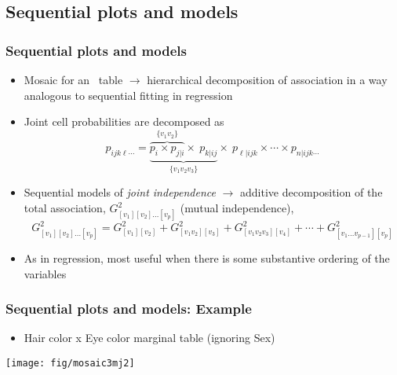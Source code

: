 \subsection{Sequential plots and models}
\begin{frame}
  \frametitle{Sequential plots and models}
  \begin{itemize}
	\item Mosaic for an \nway\ table $\rightarrow$ hierarchical decomposition of association in a way
analogous to \alert{sequential fitting} in regression
    \item Joint cell probabilities are decomposed as
\begin{equation*}
p_{ijk\ell \cdots} = \underbrace{\overbrace{p_i \times p_{j|i}}^{\{v_1 v_2\}} \times \: p_{k|ij}}_{\{v_1 v_2 v_3\}}
       \times \: p_{\ell|ijk} \times\cdots \times p_{n|ijk\cdots}
\end{equation*}
	
	\item Sequential models of \emph{joint independence} $\rightarrow$
	additive decomposition of the total association,
	$G^2_{[v_1] [v_2] \dots [v_p]}$ (mutual independence),
\begin{equation*}
G^2_{[v_1] [v_2] \dots [v_p]} =
G^2_{[v_1] [v_2]} +
G^2_{[v_1 v_2] [v_3]} +
G^2_{[v_1 v_2 v_3] [v_4]} + \cdots+
G^2_{[v_1 \dots v_{p-1}] [v_p]}
\end{equation*}
   \item As in regression, most useful when there is some \alert{substantive ordering} of the variables
 \end{itemize}

\end{frame}

\begin{frame}
   \frametitle{Sequential plots and models: Example}
  \begin{itemize}
    \item Hair color x Eye color marginal table (ignoring Sex)
  \end{itemize}
\begin{center}
  \texttt{[image: fig/mosaic3mj2]}
\end{center}
   
\end{frame}


